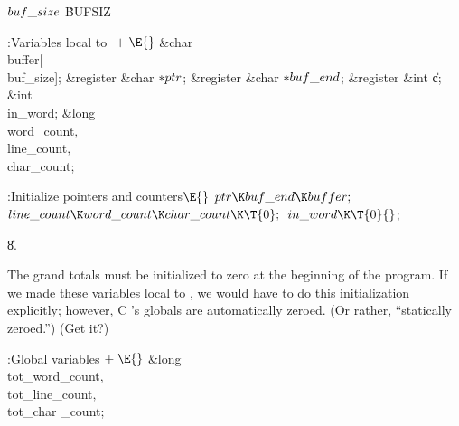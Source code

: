 \documentclass{cweb}
\def\CEE/{C\spacefactor 1000 }
\begin{document}
\Y\B\4\D$\\{buf\_size}$ \5
\.{BUFSIZ}\par
\Y\B\4:Variables local to \X${}\mathrel+\E{}$\6
\&{char} \\{buffer}[\\{buf\_size}];\6
\&{register} \&{char} ${}{*}\\{ptr}{}$;\6
\&{register} \&{char} ${}{*}\\{buf\_end}{}$;\6
\&{register} \&{int} \|c;\6
\&{int} \\{in\_word};\6
\&{long} \\{word\_count}${},{}$ \\{line\_count}${},{}$ \\{char\_count};\par
\fi

\B{}:Initialize pointers and counters\X${}\E{}$\6
$\\{ptr}\K\\{buf\_end}\K\\{buffer};{}$\6
${}\\{line\_count}\K\\{word\_count}\K\\{char\_count}\K\T{0};{}$\6
${}\\{in\_word}\K\T{0}{}$;\par
\U8.\fi

The grand totals must be initialized to zero at the beginning of the
program. If we made these variables local to , we would have to
do this initialization explicitly; however, \CEE/'s globals are automatically
zeroed. (Or rather, ``statically zeroed.'') (Get it?)

\Y\B\4:Global variables\X${}\mathrel+\E{}$\6
\&{long} \\{tot\_word\_count}${},{}$ \\{tot\_line\_count}${},{}$ \\{tot\_char%
\_count};\par
\fi
\end{document}
